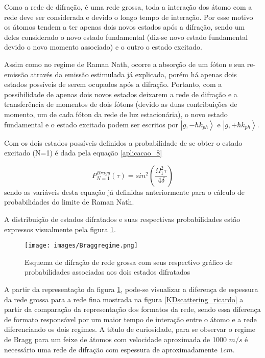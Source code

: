 			\par Como a rede de difração, é uma rede grossa, toda a interação dos átomo com a rede deve ser considerada e devido o longo tempo de interação. Por esse motivo os átomos tendem a ter apenas dois novos estados após a difração, sendo um deles considerado o novo estado fundamental (diz-se novo estado fundamental devido o novo momento associado) e o outro o estado excitado\cite{ricardo_5}.

			\par Assim como no regime de Raman Nath, ocorre a absorção de um fóton e sua re-emissão através da emissão estimulada já explicada, porém há apenas dois estados possíveis de serem ocupados após a difração. Portanto, com a possibilidade de apenas dois novos estados deixarem a rede de difração e a transferência de momentos de dois fótons (devido as duas contribuições de momento, um de cada fóton da rede de luz estacionária), o novo estado fundamental e o estado excitado podem ser escritos por  $\left|g, -\hbar k_{ph} \right>$ e  $\left|g, +\hbar k_{ph} \right>$\cite{ricardo_5}.
			
			\par Com os dois estados possíveis definidos a probabilidade de se obter o estado excitado (N=1) é dada pela equação \eqref{aplicacao_8}

			\begin{equation}
				\label{aplicacao_8}
				P_{N=1}^{Bragg}(\tau) = sin^2\left(\frac{\Omega_{1}^{2} \tau}{4\delta}\right)
			\end{equation}
			sendo as variáveis desta equação já definidas anteriormente para o cálculo de probabilidades do limite de Raman Nath\cite{ricardo_5}.
			
			\par A distribuição de estados difratados e suas respectivas probabilidades estão expressos visualmente pela figura \ref{Braggregime_ricardo}.

			\begin{figure}[h!]
		      \caption{Esquema de difração de rede grossa com seus respectivo gráfico de probabilidades associadas aos dois estados difratados}
		      \centering
		      \texttt{[image: images/Braggregime.png]}
		      \label{Braggregime_ricardo}
	    	\end{figure}

			\par A partir da representação da figura  \ref{Braggregime_ricardo}, pode-se visualizar a diferença de espessura da rede grossa para a rede fina mostrada na figura \ref{KDscattering_ricardo} a partir da comparação da representação dos formatos da rede, sendo essa diferença de formato responsável por um maior tempo de interação entre o átomo e a rede diferenciando os dois regimes. A título de curiosidade, para se observar o regime de Bragg para um feixe de átomos com velocidade aproximada de 1000 $m/s$  é necessário uma rede de difração com espessura de aproximadamente $1cm$\cite{ricardo_5}.
			
